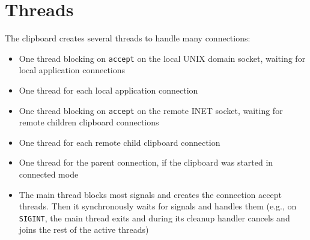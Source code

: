 \documentclass[a4paper, titlepage, english]{article}
\begin{document}
\section{Threads}
\par
The clipboard creates several threads to handle many connections:
\begin{itemize}
	\item One thread blocking on \texttt{accept} on the local UNIX domain socket, waiting for local application connections
	\item One thread for each local application connection
	\item One thread blocking on \texttt{accept} on the remote INET socket, waiting for remote children clipboard connections
	\item One thread for each remote child clipboard connection
	\item One thread for the parent connection, if the clipboard was started in connected mode
	\item The main thread blocks most signals and creates the connection accept threads. Then it synchronously waits for signals and handles them (e.g., on \texttt{SIGINT}, the main thread exits and during its cleanup handler cancels and joins the rest of the active threads)
\end{itemize}
\end{document}
